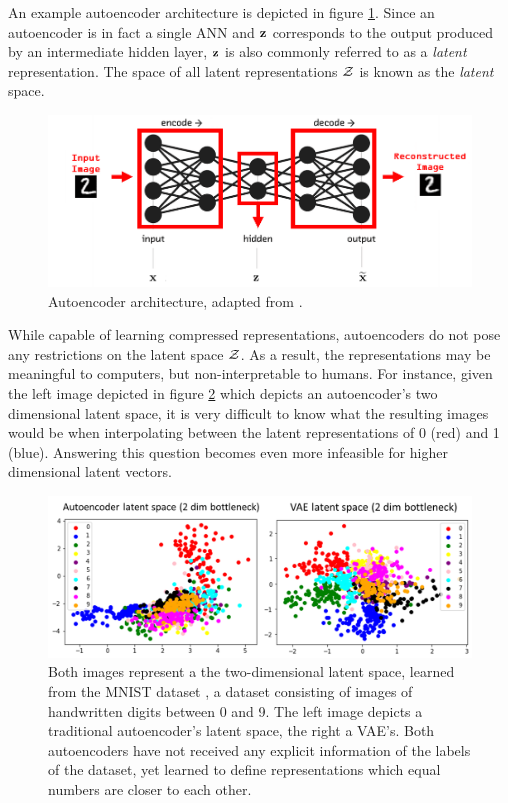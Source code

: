 An example autoencoder architecture is depicted in figure \ref{fig:autoencoder}. Since an autoencoder is in fact a single ANN and $\mathbf{z}$ corresponds to the output produced by an intermediate hidden layer, $\mathbf{z}$ is also commonly referred to as a \textit{latent} representation. The space of all latent representations $\mathcal{Z}$ is known as the \textit{latent} space.
	\begin{figure}
		\centering
		\includegraphics[width=0.7\linewidth]{autoencoder}
		\caption{Autoencoder architecture, adapted from \cite{karagiannakosHowGenerateImages2018}.}
		\label{fig:autoencoder}
	\end{figure}
While capable of learning compressed representations, autoencoders do not pose any restrictions on the latent space $\mathcal{Z}$. As a result, the representations may be meaningful to computers, but non-interpretable to humans. For instance, given the left image depicted in figure \ref{fig:latent_space_2d} which depicts an autoencoder's two dimensional latent space, it is very difficult to know what the resulting images would be when interpolating between the latent representations of 0 (red) and 1 (blue). Answering this question becomes even more infeasible for higher dimensional latent vectors.

\begin{figure}
	\centering
	\includegraphics[width=0.7\linewidth]{screenshot021}
	\caption{ Both images represent a the two-dimensional latent space, learned from the MNIST dataset \cite{PapersCodeMNIST}, a dataset consisting of images of handwritten digits between 0 and 9. 
	The left image depicts a traditional autoencoder's latent space, the right a VAE's.
 	Both autoencoders have not received any explicit information of the labels of the dataset, yet learned to define representations which equal numbers are closer to each other. 
}
	\label{fig:latent_space_2d}
\end{figure}



